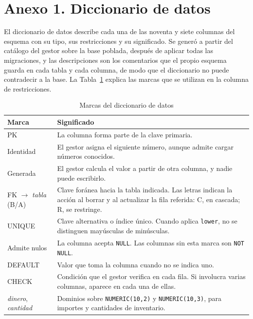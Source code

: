 \newpage
{}
\section*{Anexo 1. Diccionario de datos}
\label{anexo:diccionario}

El diccionario de datos describe cada una de las noventa y siete columnas del esquema con su tipo, sus restricciones y su significado. Se generó a partir del catálogo del gestor sobre la base poblada, después de aplicar todas las migraciones, y las descripciones son los comentarios que el propio esquema guarda en cada tabla y cada columna, de modo que el diccionario no puede contradecir a la base. La Tabla~\ref{tab:convenciones} explica las marcas que se utilizan en la columna de restricciones.

\begin{table}[H]
    \centering
    \small
    \begin{tabularx}{\textwidth}
        {
            >{\RaggedRight\arraybackslash}p{3.6cm}
            >{\RaggedRight\arraybackslash}X
        }
        \toprule
        \textbf{Marca} & \textbf{Significado} \\
        \midrule
        PK & La columna forma parte de la clave primaria. \\
        Identidad & El gestor asigna el siguiente número, aunque admite cargar números conocidos. \\
        Generada & El gestor calcula el valor a partir de otra columna, y nadie puede escribirlo. \\
        FK $\rightarrow$ \textit{tabla} (B/A) & Clave foránea hacia la tabla indicada. Las letras indican la acción al borrar y al actualizar la fila referida: C, en cascada; R, se restringe. \\
        UNIQUE & Clave alternativa o índice único. Cuando aplica \texttt{lower}, no se distinguen mayúsculas de minúsculas. \\
        Admite nulos & La columna acepta \texttt{NULL}. Las columnas sin esta marca son \texttt{NOT NULL}. \\
        DEFAULT & Valor que toma la columna cuando no se indica uno. \\
        CHECK & Condición que el gestor verifica en cada fila. Si involucra varias columnas, aparece en cada una de ellas. \\
        \textit{dinero}, \textit{cantidad} & Dominios sobre \texttt{NUMERIC(10,2)} y \texttt{NUMERIC(10,3)}, para importes y cantidades de inventario. \\
        \bottomrule
    \end{tabularx}
    \captionsetup{labelfont=bf, textfont=it, labelsep=newline, justification=raggedright, singlelinecheck=false}
    \caption{Marcas del diccionario de datos}
    \label{tab:convenciones}
\end{table}

